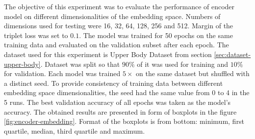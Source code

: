 The objective of this experiment was to evaluate the performance of encoder model on different dimensionalities of the embedding space. Numbers of dimensions used for testing were 16, 32, 64, 128, 256 and 512. Margin of the triplet loss was set to $0.1$. The model was trained for 50 epochs on the same training data and evaluated on the validation subset after each epoch. The dataset used for this experiment is Upper Body Dataset from section \ref{sec:dataset-upper-body}. Dataset was split so that $90 \%$ of it was used for training and $10 \%$ for validation. Each model was trained $5 \times$ on the same dataset but shuffled with a distinct seed. To provide consistency of training data between different embedding space dimensionalities, the seed had the same value from 0 to 4 in the 5 runs. The best validation accuracy of all epochs was taken as the model's accuracy. The obtained results are presented in form of boxplots in the figure \ref{fig:encoder-embedding}. Format of the boxplots is from bottom: minimum, first quartile, median, third quartile and maximum.


